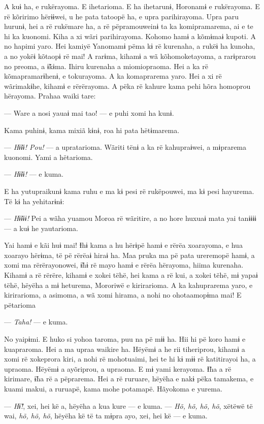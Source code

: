 A kuɨ ha, e rukërayoma. E ihetarioma. E ha ihetarunɨ, Horonamɨ e
rukërayoma. E rë kõririmo hërɨɨwei, u he pata tatoopë ha, e upra
parihirayoma. Upra paru hurunɨ, hei a rë rukëmare ha, a rë pëpramouweinɨ
ta ka komipramarema, ai e te hi ka kuonomi. Kiha a xi wãri parihirayoma.
Kohomo hamɨ a kõmɨmaɨ kupoti. A no hapimi yaro. Hei kamiyë Yanomamɨ pëma
kɨ rë kurenaha, a rukëɨ ha kunoha, a no yokëɨ kõtaopɨ rë mai! A rarɨma,
kihamɨ a wã kõhomoketayoma, a rarɨprarou no preoma, a ɨ̃kɨma. Ihiru
kurenaha a miomiopraoma. Hei a ka rë kõmapramarɨhenɨ, e tokurayoma. A ka
komaprarema yaro. Hei a xi rë wãrimakɨhe, kihamɨ e rërërayoma. A pëka rë
kahure kama pehi hõra homoprou hërayoma. Prahaa waiki tare: 

--- Ware a nosi yauaɨ mai tao! --- e puhi xomi ha kunɨ. 

Kama puhinɨ, kama mixiã kɨnɨ, roa hi pata hëtɨmarema. 

--- \textit{Hɨ̃ɨɨ! Pou!} --- a upratarioma. Wãriti tënɨ a ka rë kahupraɨwei, a
mɨprarema kuonomi. Yami a hëtarioma. 

--- \textit{Hɨ̃ɨɨ!} --- e kuma. 

E ha yutupraikunɨ kama ruhu e ma kɨ pesi rë rukëpouwei, ma kɨ pesi
hayurema. Të kɨ ha yehitarɨnɨ: 

--- \textit{Hɨ̃ɨɨɨ!} Pei a wãha yuamou Moroa rë wãritire, a no hore huxuaɨ mata yai
tanɨɨɨɨ --- a kuɨ he yautarioma. 

Yai hamɨ e kãi huɨ mai! Ɨhɨ kama a hu hërɨpë hamɨ e rërëa xoarayoma, e
hua xoarayo hërɨma, të pë rërëaɨ hiraɨ ha. Maa pruka ma pë pata
ureremopë hamɨ, a xomi ma rërërayonowei, ɨ̃hɨ rë mayo hamɨ e rërëa
hërayoma, hiima kurenaha. Kihamɨ a rë rërëre, kihamɨ e xokei tëhë, hei
kama a rë kui, a xokei tëhë, mɨ yapaɨ tëhë, hëyëha a mɨ heturema,
Mororiwë e kirirarioma. A ka kahuprarema yaro, e kirirarioma, a asimoma,
a wã xomi hirama, a nohi no ohotaamopɨma mai! E pëtarioma 

--- \textit{Taha!} --- e kuma. 

No yaipɨmi. E huko si yohoa taroma, puu na pë mɨɨ ha. Hii hi pë koro
 hamɨ e kuapraroma. Hei a ma upraa waikire ha. Hëyëmɨ a he rii
 tiheriprou, kihamɨ a xomi rë xokeprora kiri, a nohi rë mohotuaimi, hei
 te hi kɨ mɨɨ rë katitirayoi ha, a upraoma. Hëyëmɨ a ayõriprou, a
 upraoma. E mɨ yami kerayoma. Ɨ̃ha a rë kirimare, ɨ̃ha rë a pëprarema. Hei
 a rë ruruare, hëyëha e nakɨ pëka tamakema, e kuami makui, a ruruapë,
 kama mohe potamapë. Hãyokoma e yurema. 

--- \textit{Hɨ̃!}, xei, hei kë a, hëyëha a kua kure --- e kuma. --- \textit{Hõ, hõ, hõ, hõ},
xëtëwë të wai, \textit{hõ, hõ, hõ}, hëyëha kë të ta mɨpra ayo, xei, hei kë --- e
kuma. 

